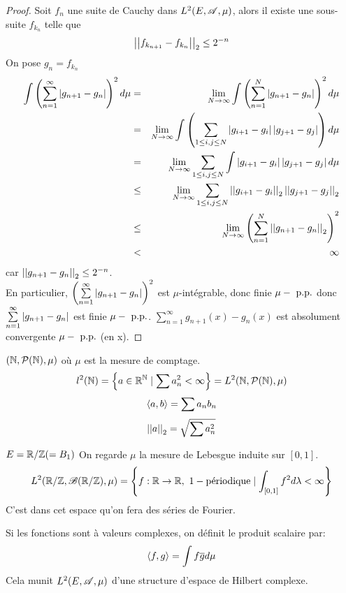 \begin{proof}
	Soit $f_n$ une suite de Cauchy dans $L^2(E, \mathscr{A}, \mu)$, alors il existe une sous-suite $f_{k_n}$ telle que
	$$\left|\left|f_{k_{n+1}} - f_{k_n}\right|\right|_2 \leq 2^{-n}$$
	On pose $g_n = f_{k_n}$
	\begin{eqnarray*}
		\int \left( \sum\limits_{n=1}^\infty \left|g_{n+1} - g_n\right| \right)^2 d \mu &=& \lim_{N \to \infty} \int \left( \sum\limits_{n=1}^N \left|g_{n+1} - g_n\right| \right)^2 d \mu \\
		&=& \lim_{N \to \infty} \int \left( \sum\limits_{1 \leq i, j \leq N} \left|g_{i+1} - g_i\right| \left|g_{j+1} - g_j\right| \right) d \mu \\
		&=& \lim_{N \to \infty}   \sum\limits_{1 \leq i, j \leq N} \int\left|g_{i+1} - g_i\right| \left|g_{j+1} - g_j\right|  d \mu \\
		&\leq& \lim_{N \to \infty} \sum\limits_{1 \leq i, j \leq N} \left|\left|g_{i+1} - g_i\right|\right|_2 \left|\left|g_{j+1} - g_j\right|\right|_2 \\
		&\leq& \lim_{N \to \infty} \left( \sum\limits_{n=1}^N \left|\left|g_{n+1} - g_n\right|\right|_2 \right)^2 \\
		&<& \infty
	\end{eqnarray*}
	car $\left|\left|g_{n+1} - g_n\right|\right|_2 \leq 2^{-n}$.\\
	En particulier, $\left( \sum\limits_{n=1}^\infty \left|g_{n+1} - g_n\right| \right)^2$ est $\mu$-intégrable, donc finie $\mu-\text{ p.p.}$ donc $ \sum\limits_{n=1}^\infty \left|g_{n+1} - g_n\right| $ est finie $\mu-\text{ p.p.}$.
	$ \sum\limits_{n=1}^\infty g_{n+1}(x) - g_n(x)$ est absolument convergente $\mu-\text{ p.p.}$ (en x).
\end{proof}

\begin{example}
	$(\mathbb{N}, \mathcal{P}(\mathbb{N}), \mu)$ où $\mu$ est la mesure de comptage.
	$$l^2(\mathbb{N}) = \left\{ a \in \mathbb{R}^{\mathbb{N}} \mid \sum a_n^2 < \infty\right\} = L^2(\mathbb{N}, \mathcal{P}(\mathbb{N}), \mu)$$
	$$\left\langle a, b \right\rangle = \sum a_n b_n$$
	$$\left|\left|a\right|\right|_2 = \sqrt{\sum a_n^2}$$
\end{example}

\begin{example}
	$ E = \mathbb{R}/\mathbb{Z} ( = B_1)$
	On regarde $\mu$ la mesure de Lebesgue induite sur $[0,1]$.
	$$ L^2(\mathbb{R}/\mathbb{Z}, \mathscr{B} (\mathbb{R}/\mathbb{Z}), \mu) = \left\{ f: \mathbb{R} \to \mathbb{R}, \  1-\text{périodique} \mid \int_{[0,1]} f^2 d\lambda < \infty \right\} $$
	C'est dans cet espace qu'on fera des séries de Fourier.
\end{example}

\begin{remarque}
	Si les fonctions sont à valeurs complexes, on définit le produit scalaire par:
	$$\left\langle f, g \right\rangle = \int f \overline{g} d \mu$$
	Cela munit $L^2(E, \mathscr{A}, \mu)$ d'une structure d'espace de Hilbert complexe.
\end{remarque}
